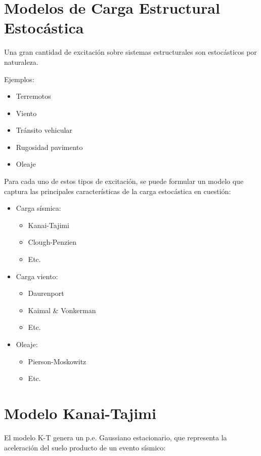 \section{Modelos de Carga Estructural Estocástica}
Una gran cantidad de excitación sobre sistemas estructurales son estocásticos por naturaleza.\\
\par Ejemplos:
\begin{itemize}
    \item Terremotos
    \item Viento
    \item Tránsito vehicular
    \item Rugosidad pavimento
    \item Oleaje
\end{itemize}

Para cada uno de estos tipos de excitación, se puede formular un modelo que captura las principales características de la carga estocástica en cuestión:
\begin{itemize}
    \item Carga sísmica: 
    \begin{itemize}
        \item Kanai-Tajimi
        \item Clough-Penzien
        \item Etc.
    \end{itemize}
    \item Carga viento:
    \begin{itemize}
        \item Daurenport
        \item Kaimal \& Vonkerman
        \item Etc.
    \end{itemize}
    \item Oleaje:
    \begin{itemize}
        \item Pierson-Moskowitz
        \item Etc.
    \end{itemize}
\end{itemize}

\section{Modelo Kanai-Tajimi}
El modelo K-T genera un p.e. Gaussiano estacionario, que representa la aceleración del suelo producto de un evento sísmico: \\


